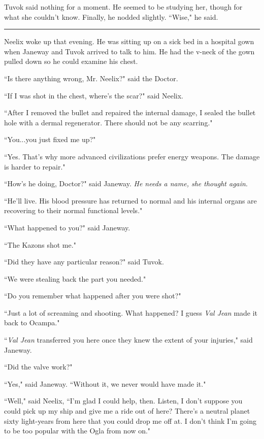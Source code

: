 \documentclass[twoside,letterpaper,12pt]{memoir}
\begin{document}
Tuvok said nothing for a moment. He seemed to be studying her, though for what she couldn't know. Finally, he nodded slightly. ``Wise," he said. 

\begin{center}\rule{3cm}{0.4 pt}\end{center} 

Neelix woke up that evening. He was sitting up on a sick bed in a hospital gown when Janeway and Tuvok arrived to talk to him. He had the v-neck of the gown pulled down so he could examine his chest. 

``Is there anything wrong, Mr. Neelix?" said the Doctor. 

``If I was shot in the chest, where's the scar?" said Neelix. 

``After I removed the bullet and repaired the internal damage, I sealed the bullet hole with a dermal regenerator. There should not be any scarring." 

``You...you just fixed me up?" 

``Yes. That's why more advanced civilizations prefer energy weapons. The damage is harder to repair." 

``How's he doing, Doctor?" said Janeway. \textit{He needs a name, she thought again}. 

``He'll live. His blood pressure has returned to normal and his internal organs are recovering to their normal functional levels." 

``What happened to you?" said Janeway. 

``The Kazons shot me." 

``Did they have any particular reason?" said Tuvok. 

``We were stealing back the part you needed." 

``Do you remember what happened after you were shot?" 

``Just a lot of screaming and shooting. What happened? I guess \textit{Val Jean} made it back to Ocampa." 

``\textit{Val Jean} transferred you here once they knew the extent of your injuries," said Janeway. 

``Did the valve work?" 

``Yes," said Janeway. ``Without it, we never would have made it." 

``Well," said Neelix, ``I'm glad I could help, then. Listen, I don't suppose you could pick up my ship and give me a ride out of here? There's a neutral planet sixty light-years from here that you could drop me off at. I don't think I'm going to be too popular with the Ogla from now on." 
\end{document}
